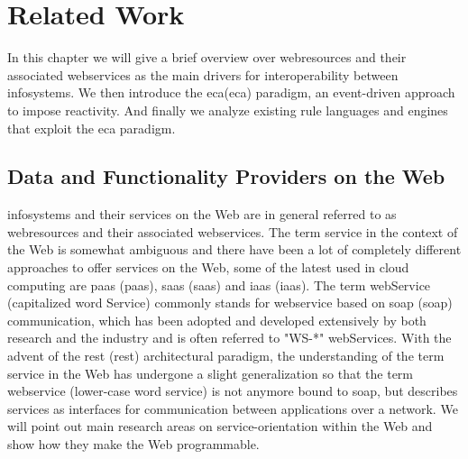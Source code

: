 
\chapter{Related Work}

In this chapter we will give a brief overview over \textrm{\glspl{webresource}} and their associated \textrm{\glspl{webservice}} as the main drivers for interoperability between \textrm{\glspl{infosystem}}.
We then introduce the \textrm{\acrlong{eca}(\acrshort{eca})} paradigm, an event-driven approach to impose reactivity.
And finally we analyze existing rule languages and engines that exploit the \textrm{\acrshort{eca}} paradigm.



\section{Data and Functionality Providers on the Web}
\textrm{\glspl{infosystem}} and their services on the Web are in general referred to as \textrm{\glspl{webresource}} and their associated \textrm{\glspl{webservice}}.
The term service in the context of the Web is somewhat ambiguous and there have been a lot of completely different approaches to offer services on the Web, some of the latest used in cloud computing are \textrm{\acrlong{paas} (\acrshort{paas})}, \textrm{\acrlong{saas} (\acrshort{saas})} and \textrm{\acrlong{iaas} (\acrshort{iaas})}.
The term \textrm{\gls{webService}} (capitalized word \textrm{Service}) commonly stands for \textrm{\gls{webservice}} based on \textrm{\acrlong{soap} (\acrshort{soap})} communication\cite{journals/itpro/BarrosD06}, which has been adopted and developed extensively by both research and the industry and is often referred to "WS-*" \textrm{\glspl{webService}}.
With the advent of the \textrm{\acrlong{rest} (\acrshort{rest})} architectural paradigm, the understanding of the term service in the Web has undergone a slight generalization so that the term \textrm{\gls{webservice}} (lower-case word \textrm{service}) is not anymore bound to \textrm{\acrshort{soap}}, but describes services as interfaces for communication between applications over a network\cite{richardson2008restful}.
We will point out main research areas on service-orientation within the Web and show how they make the Web programmable.


